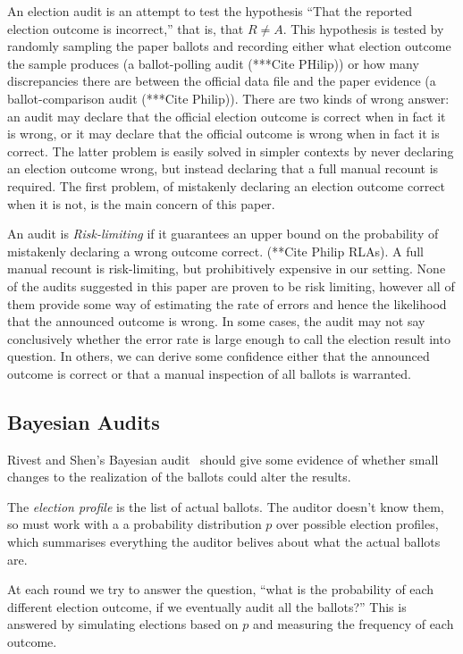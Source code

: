 \documentclass[10pt,a4paper]{article}
\begin{document}
An election audit is an attempt to test the hypothesis ``That the reported election outcome is incorrect,'' that is, that $R \neq A$.  This hypothesis is tested by randomly sampling the paper ballots and recording either what election outcome the sample produces (a ballot-polling audit  (***Cite PHilip)) or how many discrepancies there are between the official data file and the paper evidence (a ballot-comparison audit  (***Cite Philip)). There are two kinds of wrong answer: an audit may declare that the official election outcome is correct when in fact it is wrong, or it may declare that the official outcome is wrong when in fact it is correct.  The latter problem is easily solved in simpler contexts by never declaring an election outcome wrong, but instead declaring that a full manual recount is required.  The first problem, of mistakenly declaring an election outcome correct when it is not, is the main concern of this paper.

An audit is \emph{Risk-limiting} if it guarantees an upper bound on the probability of mistakenly declaring a wrong outcome correct. (**Cite Philip RLAs).  A full manual recount is risk-limiting, but prohibitively expensive in our setting.  None of the audits suggested in this paper are proven to be risk limiting, however all of them provide some way of estimating the rate of errors and hence the likelihood that the announced outcome is wrong.  In some cases, the audit may not say conclusively whether the error rate is large enough to call the election result into question.  In others, we can derive some confidence either that the announced outcome is correct or that a manual inspection of all ballots is warranted.

\subsection{Bayesian Audits} Rivest and Shen's Bayesian audit~\cite{rivest2012bayesian} should give some evidence of whether small changes to the realization of the ballots could alter the results. 

The \emph{election profile} is the list of actual ballots. The auditor doesn't know them, so must work with a a probability distribution $p$ over possible election profiles, which summarises everything the auditor belives about what the actual ballots are. 

At each round we try to answer the question, ``what is the probability of each different election outcome, if we eventually audit all the ballots?''  This is answered by simulating elections based on $p$ and measuring the frequency of each outcome.  
\end{document}
